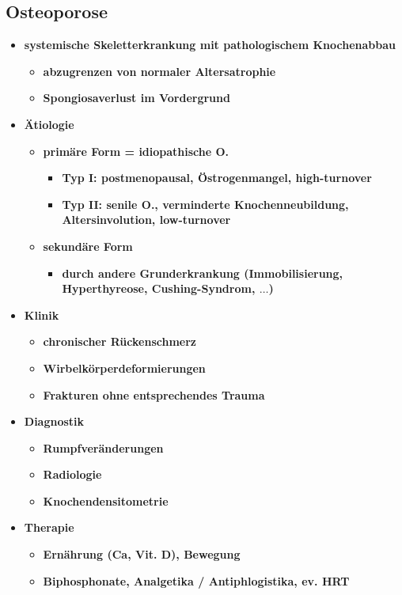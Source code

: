 \subsection{Osteoporose}
	\begin{itemize}
		\item \textbf{systemische Skeletterkrankung mit pathologischem Knochenabbau}
			\begin{itemize}
				\item \textbf{abzugrenzen von normaler Altersatrophie}
				\item \textbf{Spongiosaverlust im Vordergrund}
			\end{itemize}
		\item \textbf{Ätiologie}
			\begin{itemize}
				\item \textbf{primäre Form = idiopathische O.}
					\begin{itemize}
						\item \textbf{Typ I: postmenopausal, Östrogenmangel, high-turnover}
						\item \textbf{Typ II: senile O., verminderte Knochenneubildung, Altersinvolution, low-turnover}
					\end{itemize}
				\item \textbf{sekundäre Form}
					\begin{itemize}
						\item \textbf{durch andere Grunderkrankung (Immobilisierung, Hyperthyreose, Cushing-Syndrom, $\dots$)}
					\end{itemize}
			\end{itemize}
		\item \textbf{Klinik}
			\begin{itemize}
				\item \textbf{chronischer Rückenschmerz}
				\item \textbf{Wirbelkörperdeformierungen}
				\item \textbf{Frakturen ohne entsprechendes Trauma}
			\end{itemize}
		\item \textbf{Diagnostik}
			\begin{itemize}
				\item \textbf{Rumpfveränderungen}
				\item \textbf{Radiologie}
				\item \textbf{Knochendensitometrie}
			\end{itemize}
		\item \textbf{Therapie}
			\begin{itemize}
				\item \textbf{Ernährung (Ca, Vit. D), Bewegung}
				\item \textbf{Biphosphonate, Analgetika / Antiphlogistika, ev. HRT}
			\end{itemize}
 	\end{itemize}

